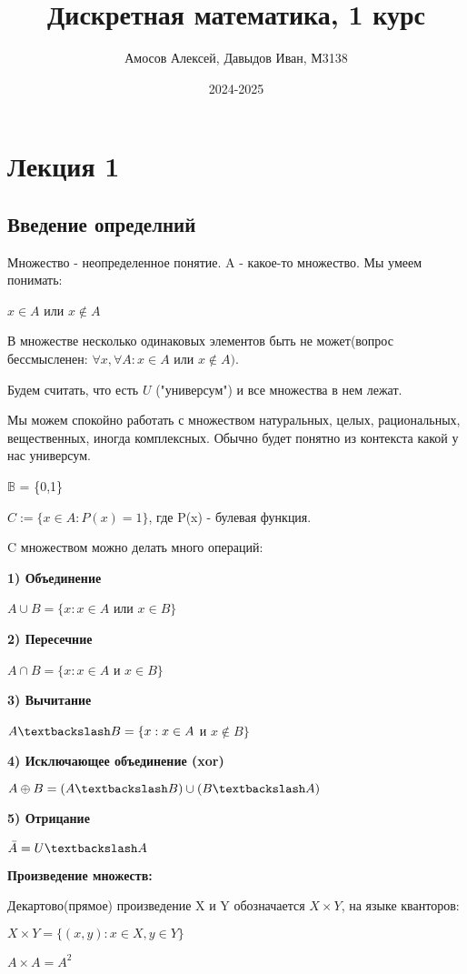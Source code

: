 \documentclass{article}
\title{Дискретная математика, 1 курс}
\author{Амосов Алексей, Давыдов Иван, М3138}
\date{2024-2025}
\begin{document}
\maketitle
\tableofcontents
\pagebreak

\section{Лекция 1}
\subsection{Введение определний}
Множество - неопределенное понятие. A - какое-то множество. Мы умеем понимать:

$x \in A$ или $x \notin A$ 

В множестве несколько одинаковых элементов быть не может(вопрос бессмысленен:  $\forall x, \forall A: x \in  A  $ или $ x \notin A).$

Будем считать, что есть $U$ ("универсум") и все множества в нем лежат.

Мы можем спокойно работать с множеством натуральных, целых, рациональных, вещественных, иногда комплексных. Обычно будет понятно из контекста какой у нас универсум.

$\mathbb{B}$ = \{0,1\}

$C:=\{x \in A: P(x) = 1\}$, где P(x) - булевая функция.

C множеством можно делать много операций:

\textbf{1) Объединение}

$A \cup B = \{x: x \in A$  или $x \in B \}$

\textbf{2) Пересечние}

$A \cap B = \{x: x \in A$ и $x \in B \}$

\textbf{3) Вычитание}

$A \textbackslash B = \{x: x \in A$ и $x \notin B \}$

\textbf{4) Исключающее объединение (xor)}

$A \oplus B = (A \textbackslash B) \cup (B \textbackslash A)$

\textbf{5) Отрицание}

$\bar{A} = U \textbackslash A$

\textbf{Произведение множеств:}

Декартово(прямое) произведение X и Y обозначается $X \times Y$, на языке кванторов:

 $X \times Y = \{(x,y):x \in X, y \in Y\}$ 
 
$A \times A = A^2$
\end{document}
